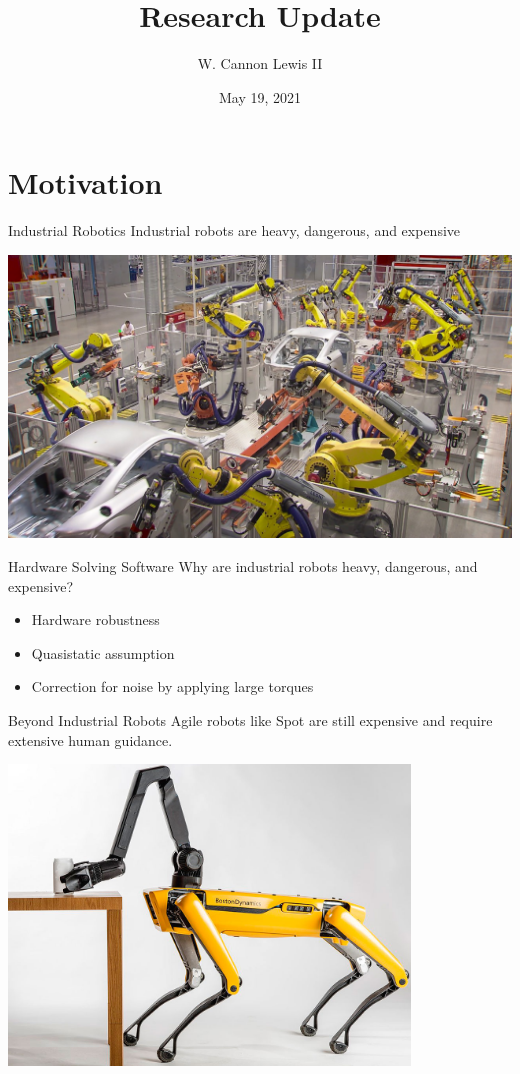 \documentclass{beamer}
\title{Research Update}
\author{W. Cannon Lewis II}
\date{May 19, 2021}
\begin{document}
\begin{frame}
  \titlepage
\end{frame}

\section{Motivation}

\begin{frame}{Industrial Robotics}
  Industrial robots are heavy, dangerous, and expensive

  \includegraphics[keepaspectratio,width=\textwidth]{assets/factory_robots}
\end{frame}

\begin{frame}{Hardware Solving Software}
  Why are industrial robots heavy, dangerous, and expensive? 
  \begin{itemize}
    \item Hardware robustness
    \item Quasistatic assumption
    \item Correction for noise by applying large torques
  \end{itemize}
\end{frame}

\begin{frame}{Beyond Industrial Robots}
  Agile robots like Spot are still expensive and require extensive human guidance.

  \begin{center}
    \includegraphics[keepaspectratio,width=0.8\textwidth]{assets/spotmini}
  \end{center}
\end{frame}
\end{document}
